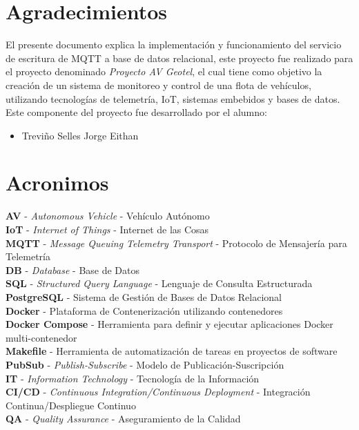 \section*{Agradecimientos}

\vspace{0.5 cm}

El presente documento explica la implementación y funcionamiento del servicio de escritura de MQTT a base de datos relacional,
este proyecto fue realizado para el proyecto denominado \textit{Proyecto AV Geotel}, el cual tiene como objetivo
la creación de un sistema de monitoreo y control de una flota de vehículos, utilizando tecnologías de telemetría, IoT,
sistemas embebidos y bases de datos. Este componente del proyecto fue desarrollado por el alumno:

\begin{itemize}[noitemsep]
    \item Treviño Selles Jorge Eithan
\end{itemize}

\newpage

\section*{Acronimos}
\textbf{AV} - \textit{Autonomous Vehicle} - Vehículo Autónomo \\
\textbf{IoT} - \textit{Internet of Things} - Internet de las Cosas \\
\textbf{MQTT} - \textit{Message Queuing Telemetry Transport} - Protocolo de Mensajería para Telemetría \\
\textbf{DB} - \textit{Database} - Base de Datos \\
\textbf{SQL} - \textit{Structured Query Language} - Lenguaje de Consulta Estructurada \\
\textbf{PostgreSQL} - Sistema de Gestión de Bases de Datos Relacional \\
\textbf{Docker} - Plataforma de Contenerización utilizando contenedores \\
\textbf{Docker Compose} - Herramienta para definir y ejecutar aplicaciones Docker multi-contenedor \\
\textbf{Makefile} - Herramienta de automatización de tareas en proyectos de software \\
\textbf{PubSub} - \textit{Publish-Subscribe} - Modelo de Publicación-Suscripción \\
\textbf{IT} - \textit{Information Technology} - Tecnología de la Información \\
\textbf{CI/CD} - \textit{Continuous Integration/Continuous Deployment} - Integración Continua/Despliegue Continuo \\
\textbf{QA} - \textit{Quality Assurance} - Aseguramiento de la Calidad


